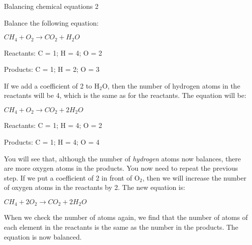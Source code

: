 \begin{wex}{Balancing chemical equations 2}{Balance the following equation:
\begin{center}
\rm${CH_{4} + O_{2} \rightarrow CO_{2} + H_{2}O}$
\end{center}
}

{

Reactants: C = 1; H = 4; O = 2

Products: C = 1; H = 2; O = 3\\
}

{

If we add a coefficient of 2 to H$_{2}$O, then the number of hydrogen atoms in the reactants will be 4, which is the same as for the reactants. The equation will be:

\begin{center}
\rm${CH_{4} + O_{2} \rightarrow CO_{2} + 2H_{2}O}$\\
\end{center}
}

{

Reactants: C = 1; H = 4; O = 2

Products: C = 1; H = 4; O = 4

You will see that, although the number of \textit{hydrogen} atoms now balances, there are more oxygen atoms in the products. You now need to repeat the previous step. If we put a coefficient of 2 in front of O$_{2}$, then we will increase the number of oxygen atoms in the reactants by 2. The new equation is:

\begin{center}
\rm${CH_{4} + 2O_{2} \rightarrow CO_{2} + 2H_{2}O}$
\end{center}

When we check the number of atoms again, we find that the number of atoms of each element in the reactants is the same as the number in the products. The equation is now balanced.
}
\end{wex}

